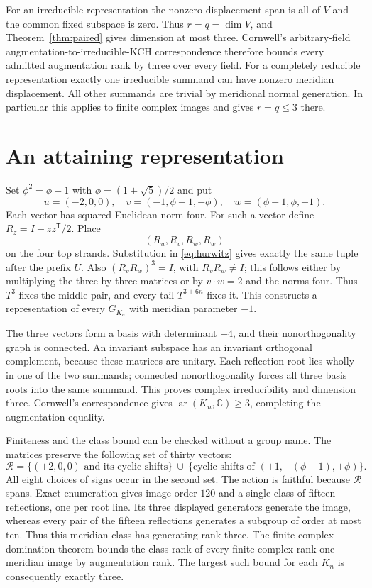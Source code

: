 \documentclass[11pt]{article}
\newcommand{\ar}{\operatorname{ar}}
\newcommand{\C}{\mathbb C}
\begin{document}
For an irreducible representation the nonzero displacement span is
all of $V$ and the common fixed subspace is zero. Thus $r=q=\dim V$,
and Theorem~\ref{thm:paired} gives dimension at most three.
Cornwell's arbitrary-field augmentation-to-irreducible-KCH
correspondence \cite[Theorem~1.2 and Definition~1.8]{cornwell} therefore
bounds every admitted augmentation rank by three over every field.
For a completely reducible representation exactly one irreducible
summand can have nonzero meridian displacement. All other summands
are trivial by meridional normal generation. In particular this
applies to finite complex images and gives $r=q\le3$ there.

\section{An attaining representation}

Set $\phi^2=\phi+1$ with $\phi=(1+\sqrt5)/2$ and put
\[
 u=(-2,0,0),\quad v=(-1,\phi-1,-\phi),\quad
 w=(\phi-1,\phi,-1).
\]
Each vector has squared Euclidean norm four. For such a vector define
$R_z=I-zz^{\mathsf T}/2$. Place
\[
                 (R_u,R_v,R_w,R_w)
\]
on the four top strands. Substitution in \eqref{eq:hurwitz} gives
exactly the same tuple after the prefix $U$.
Also $(R_vR_w)^3=I$, with $R_vR_w\ne I$; this follows either by
multiplying the three by three matrices or by $v\cdot w=2$ and the
norms four. Thus $T^3$ fixes the middle pair, and every tail
$T^{3+6n}$ fixes it. This constructs a representation of every $G_{K_n}$
with meridian parameter $-1$.

The three vectors form a basis with determinant $-4$, and their
nonorthogonality graph is connected. An invariant subspace has an
invariant orthogonal complement, because these matrices are unitary.
Each reflection root lies wholly in one of the two summands; connected
nonorthogonality forces all three basis roots into the same summand.
This proves complex irreducibility and dimension three.
Cornwell's correspondence gives $\ar(K_n,\C)\ge3$, completing the
augmentation equality.

Finiteness and the class bound can be checked without a group name.
The matrices preserve the following set of thirty vectors:
\[
 \mathcal R=\{(\pm2,0,0)\text{ and its cyclic shifts}\}
 \ \cup\ \{\text{cyclic shifts of }(\pm1,\pm(\phi-1),\pm\phi)\}.
\]
All eight choices of signs occur in the second set. The action is
faithful because $\mathcal R$ spans. Exact enumeration gives image
order $120$ and a single class of fifteen reflections, one per root
line. Its three displayed generators generate the image, whereas
every pair of the fifteen reflections generates a subgroup of order
at most ten. Thus this meridian class has generating rank three.
The finite complex domination theorem
\cite[Theorem \texttt{thm:domination}]{domination} bounds the class rank
of every finite complex rank-one-meridian image by augmentation rank.
The largest such bound for each $K_n$ is consequently exactly three.
\end{document}
